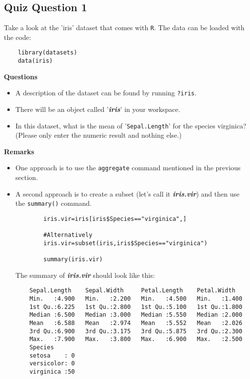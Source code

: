 \documentclass[12pt]{article}
\begin{document}
\subsection*{Quiz Question 1}
Take a look at the 'iris' dataset that comes with \texttt{R}. The data can be loaded with the code:
\begin{framed}
	\begin{verbatim}
	library(datasets)
	data(iris)
	\end{verbatim}
\end{framed}
\noindent \textbf{Questions}
\begin{itemize}
	\item A description of the dataset can be found by running \texttt{?iris}.
	\item 
	There will be an object called '\textit{\textbf{iris}}' in your workspace. 
	\item In this dataset, what is the mean of '\texttt{Sepal.Length}' for the species virginica? (Please only enter the numeric result and nothing else.)
\end{itemize}
\textbf{Remarks}
\begin{itemize}
	\item One approach is to use the \texttt{aggregate} command mentioned in the previous section.
	\item A second approach is to create a subset (let's call it \textit{\textbf{iris.vir}}) and then use the \texttt{summary()} command.
	\begin{framed}
		\begin{verbatim}
		iris.vir=iris[iris$Species=="virginica",]
		
		#Alternatively
		iris.vir=subset(iris,iris$Species=="virginica")
		
		summary(iris.vir)
		\end{verbatim}
	\end{framed}
	\newpage
	The summary of \textit{\textbf{iris.vir}} should look like this:
	\begin{verbatim}
	Sepal.Length    Sepal.Width     Petal.Length    Petal.Width   
	Min.   :4.900   Min.   :2.200   Min.   :4.500   Min.   :1.400  
	1st Qu.:6.225   1st Qu.:2.800   1st Qu.:5.100   1st Qu.:1.800  
	Median :6.500   Median :3.000   Median :5.550   Median :2.000  
	Mean   :6.588   Mean   :2.974   Mean   :5.552   Mean   :2.026  
	3rd Qu.:6.900   3rd Qu.:3.175   3rd Qu.:5.875   3rd Qu.:2.300  
	Max.   :7.900   Max.   :3.800   Max.   :6.900   Max.   :2.500  
	Species  
	setosa    : 0  
	versicolor: 0  
	virginica :50  
	
	\end{verbatim}
\end{itemize}
\end{document}
